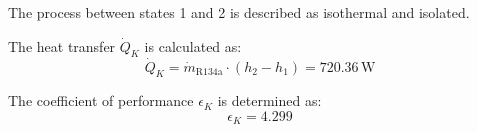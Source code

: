 The process between states 1 and 2 is described as isothermal and isolated.  

The heat transfer \( \dot{Q}_K \) is calculated as:  
\[
\dot{Q}_K = \dot{m}_{\text{R134a}} \cdot (h_2 - h_1) = 720.36 \, \text{W}
\]  

The coefficient of performance \( \epsilon_K \) is determined as:  
\[
\epsilon_K = 4.299
\]